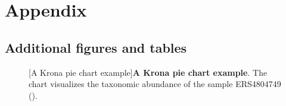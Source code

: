 \appendix
\chapter{Appendix}\label{appendix}
\section{Additional figures and tables}\label{appendix_further_figures}

\begin{figure}[H]
  \centering
  [A Krona pie chart example]{\textbf{A Krona pie chart example}. The chart visualizes the taxonomic abundance of the sample ERS4804749 ().} \label{fig:krona_example}%
\end{figure}

